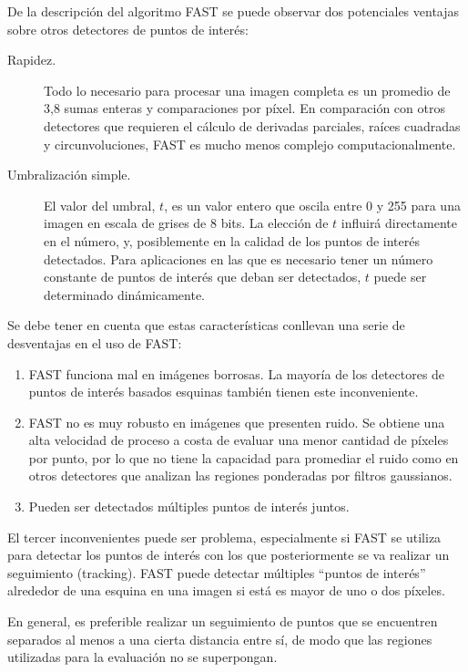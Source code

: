 De la descripción del algoritmo FAST se puede observar dos potenciales ventajas sobre otros detectores de puntos de interés:
\begin{description}
\item[Rapidez.] Todo lo necesario para procesar una imagen completa es un promedio de 3,8 sumas enteras y comparaciones por píxel. En comparación con otros detectores que requieren el cálculo de derivadas parciales, raíces cuadradas y circunvoluciones, FAST es mucho menos complejo computacionalmente.
\item[Umbralización simple.] El valor del umbral, $t$, es un valor entero que oscila entre 0 y 255 para una imagen en escala de grises de 8 bits. La elección de $t$ influirá directamente en el número, y, posiblemente en la calidad de los puntos de interés detectados. Para aplicaciones en las que es necesario tener un número constante de puntos de interés que deban ser detectados, $t$ puede ser determinado dinámicamente.
\end{description}

Se debe tener en cuenta que estas características conllevan una serie de desventajas en el uso de FAST: 
\begin{enumerate}
\item FAST funciona mal en imágenes borrosas. La mayoría de los detectores de puntos de interés basados esquinas también tienen este inconveniente.
\item FAST no es muy robusto en imágenes que presenten ruido. Se obtiene una alta velocidad de proceso a costa de evaluar una menor cantidad de píxeles por punto, por lo que  no tiene la capacidad para promediar el ruido como en otros detectores que analizan las regiones ponderadas por filtros gaussianos.
\item Pueden ser detectados múltiples puntos de interés juntos. 
\end{enumerate}

El tercer inconvenientes puede ser problema, especialmente si FAST se utiliza para detectar los puntos de interés con los que posteriormente se va realizar un seguimiento (tracking). FAST puede detectar múltiples ``puntos de interés'' alrededor de una esquina en una imagen si está es mayor de uno o dos píxeles. 

En general, es preferible realizar un seguimiento de puntos que se encuentren separados al menos a una cierta distancia entre sí, de modo que las regiones utilizadas para la evaluación no se superpongan. 

